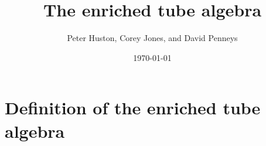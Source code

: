 \documentclass[11pt]{article}
\newcommand{\arxiv}[1]{\href{http://arxiv.org/abs/#1}{\tt arXiv:\nolinkurl{#1}}}
\theoremstyle{plain}
\theoremstyle{definition}
\begin{document}
\title{The enriched tube algebra}
\author{Peter Huston, Corey Jones, and David Penneys}
\date{\today}
\maketitle
\begin{abstract}
\end{abstract}

\section{Definition of the enriched tube algebra}
\end{document}
